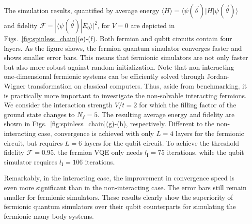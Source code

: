 \documentclass[aps, pra, reprint, superscriptaddress]{revtex4-1}
\begin{document}
The simulation results, quantified by average energy $\langle H\rangle {=}\langle\psi(\vec{\theta})|H|\psi(\vec{\theta})\rangle$ and fidelity $\mathcal{F}{=}|\langle \psi(\vec{\theta})|E_0\rangle|^2$, for $V{=}0$ are depicted in Figs.~\ref{fig:spinless_chain}(e)-(f). 
Both fermion and qubit circuits contain four layers. As the figure shows, the fermion quantum simulator converges faster and shows smaller error bars. This means that fermionic simulators are not only faster but also more robust against random initialization. Note that non-interacting one-dimensional fermionic systems can be efficiently solved through Jordan-Wigner transformation on classical computers. Thus, aside from benchmarking, it is practically more important to investigate the non-solvable interacting fermions. We consider the interaction strength $V/t{=}2$ for which the filling factor of the ground state changes to $N_f{=}5$. 
The resulting average energy and fidelity are shown in  Figs.~\ref{fig:spinless_chain}(g)-(h), respectively. 
 Different to the non-interacting case, convergence is achieved with only $L{=}4$ layers for the fermionic circuit, but requires $L{=}6$ layers for the qubit circuit. To achieve the threshold fidelity $\mathcal{F}{=}0.95$, the fermion VQE only needs $l_\text{I}{=}75$ iterations, while the qubit simulator requires $l_\text{I}{=}106$ iterations. 

Remarkably, in the interacting case, the improvement in convergence speed is even more significant than in the non-interacting case. The error bars still remain smaller for fermionic simulators. These results clearly show the superiority of fermionic quantum simulators over their qubit counterparts for simulating the fermionic many-body systems. 

 
\end{document}
